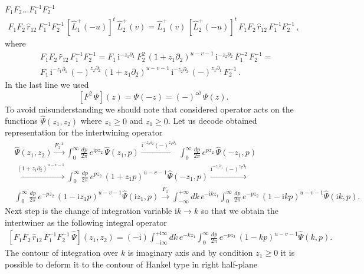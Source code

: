 \documentclass[11pt]{article}
\numberwithin{equation}{section}
\theoremstyle{plain}
\theoremstyle{definition}
\def\dd{\partial}
\renewcommand{\imath}{\mathrm{i}}
\begin{document}
$F_1 F_2 \ldots F^{-1}_1 F^{-1}_2$  
\begin{align}
	F_1 F_2\,\hat{r}_{12}\,F_1^{-1} F_2^{-1}\,
	\left[\hat{L}_1^+(-u)\right]^t\,\hat{L}^{+}_{2}(v)
	= \hat{L}^{+}_{1}(v)\,\left[\hat{L}_2^+(-u)\right]^t\,
	F_1 F_2\,\hat{r}_{12}\,F_1^{-1} F_2^{-1} \,, 
\end{align}
where
\begin{align*}
	&F_1 F_2\,\hat{r}_{12}\,F_1^{-1} F_2^{-1} = 
	F_1\,\imath^{-z_1\partial_1}\,F_2^2\,(1+z_{1} \dd_{2})^{u-v-1} 
	\,\imath^{-z_2\partial_2}\,F_1^{-2}\,F_2^{-1} = \\[6pt]
	&F_1\,\imath^{-z_1\partial_1}\,(-)^{z_2\partial_2}\,(1+z_{1} \dd_{2})^{u-v-1} 
	\,\imath^{-z_2\partial_2}\,(-)^{z_1\partial_1}\,F_2^{-1}\,.
\end{align*}
In the last line we used 
$$
\left[F^2\,\Psi\right](z) = \Psi(-z) = (-)^{z\partial}\,\Psi(z).
$$
To avoid misunderstanding we should note that considered operator 
acts on the functions $\hat{\Psi}(z_1,z_2)$ where $z_1 \geq 0$ and $z_1 \geq 0$. 
Let us decode obtained representation for the intertwining operator 
\begin{align*}
	&\hat{\Psi}(z_1,z_2) \xrightarrow{F_2^{-1}} 
	\int_{0}^{\infty} \frac{d p}{2\pi}\,e^{\imath p z_2}\,\hat{\Psi}(z_1,p) \xrightarrow{\imath^{-z_2\partial_2}(-)^{z_1\partial_1}} 
	\int_{0}^{\infty} \frac{d p}{2\pi}\,e^{p z_2}\,\hat{\Psi}(-z_1,p)\\
	&\xrightarrow{(1+z_{1} \dd_{2})^{u-v-1}} 
	\int_{0}^{\infty} \frac{d p}{2\pi}\,e^{p z_2}\,
	(1+z_{1} p)^{u-v-1}\hat{\Psi}(-z_1,p)
	\xrightarrow{\imath^{-z_1\partial_1}\,(-)^{z_2\partial_2}}\\
	&\int_{0}^{\infty} \frac{d p}{2\pi}\,e^{-p z_2}\,
	(1-\imath z_{1} p)^{u-v-1}\hat{\Psi}(\imath z_1,p)  
	\xrightarrow{F_1} \int_{-\infty}^{+\infty} d k\, e^{-\imath k z_1 }\int_{0}^{\infty} \frac{d p}{2\pi}\,e^{-p z_2}\,
	(1-\imath k p)^{u-v-1}\hat{\Psi}(\imath k,p) .
\end{align*}
Next step is the change of integration variable $\imath k \to k $ so that 
we obtain the intertwiner as the following integral operator  
\begin{align*}
	\left[F_1 F_2\,\hat{r}_{12}\,F_1^{-1} F_2^{-1}\,\hat{\Psi}\right](z_1,z_2) 
	= (-\imath)\int_{-\imath\infty}^{+\imath\infty} d k\, e^{-k z_1 }\int_{0}^{\infty} \frac{d p}{2\pi}\,e^{-p z_2}\,(1-k p)^{u-v-1}\hat{\Psi}(k,p) .
\end{align*}
The contour of integration over $k$ is imaginary axis and by condition $z_1 \geq 0$ it is possible to deform it to the contour of Hankel type in right half-plane 
\end{document}
